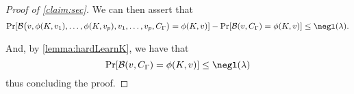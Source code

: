 \begin{proof}[Proof of \cref{claim:sec}]
We can then assert that
\begin{equation*}
		\Pr[\adversB\big(v, \phi(K, v_1), \dots, \phi(K, v_p), v_1, \dots, v_p, \circNeigb\big) = \phi(K, v)]
			 - \Pr[\adversB(v, \circNeigb) = \phi(K, v)]
	\leq \negl(\lambda).
\end{equation*}


And, by \cref{lemma:hardLearnK}, we have that
\begin{equation*}
	\Pr[\adversB(v, \circNeigb) = \phi(K, v)] \leq \negl(\lambda)
\end{equation*}
thus concluding the proof.
\end{proof}



